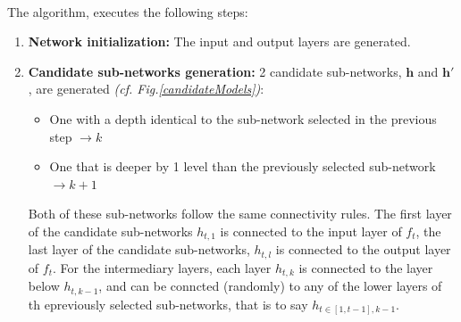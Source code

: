 \documentclass[11 pt]{article}
\begin{document}
\paragraph{} The algorithm, executes the following steps:
\begin{enumerate}
	\item \textbf{Network initialization: }The input and output layers are generated.
	\item \textbf{Candidate sub-networks generation: }2 candidate sub-networks, \(\mathbf{h}\) and \(\mathbf{h'}\), are generated \textit{(cf. Fig.\ref{candidateModels})}:
	\begin{itemize}
		\item One with a depth identical to the sub-network selected in the previous step \(\rightarrow k\)
		\item One that is deeper by 1 level than the previously selected sub-network \(\rightarrow k+1\)
	\end{itemize}
	Both of these sub-networks follow the same connectivity rules. The first layer of the candidate sub-networks \(h_{t,1}\) is connected to the input layer of \(f_t\), the last layer of the candidate sub-networks, \(h_{t,l}\) is connected to the output layer of \(f_t\). For the intermediary layers, each layer \(h_{t,k}\) is connected to the layer below \(h_{t,k-1}\), and can be conncted (randomly) to any of the lower layers of th epreviously selected sub-networks, that is to say \(h_{t\in[1,t-1], k-1}\).\\

\end{enumerate}
\end{document}
